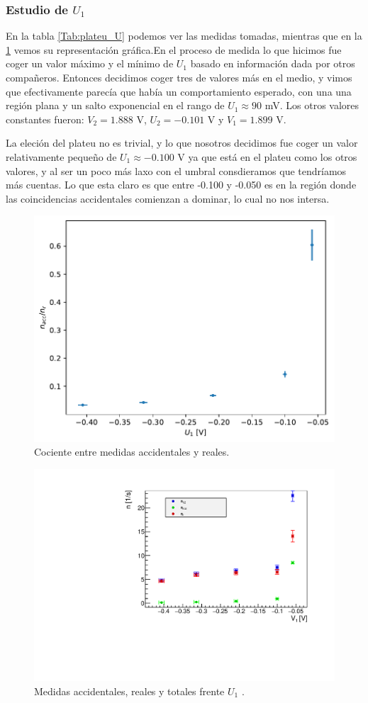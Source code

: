 \documentclass[11pt]{article}
\begin{document}
\subsubsection{Estudio de $U_1$}


En la tabla \ref{Tab:plateu_U} podemos ver las medidas tomadas, mientras que en la \cref{Fig:plateuU} vemos su representación gráfica.En el proceso de medida lo que hicimos fue coger un valor máximo  y el mínimo de $U_1$ basado en información dada por otros compañeros. Entonces decidimos coger tres de valores más en el medio, y vimos que efectivamente parecía que había un comportamiento esperado, con una una región plana y un salto exponencial en el rango de $U_1\approx 90$ mV. Los otros valores constantes fueron: $V_2=1.888$ V, $U_2=-0.101$ V y $V_1=1.899$ V.

La eleción del plateu no es trivial, y lo que nosotros decidimos fue coger un valor relativamente pequeño de $U_1\approx - 0.100$ V ya que  está en el plateu como los otros valores, y al ser un poco más laxo con el umbral consdieramos que tendríamos más cuentas. Lo que esta claro es que entre -0.100 y -0.050 es en la región donde las coincidencias accidentales comienzan a dominar, lo cual no nos intersa. 

\begin{figure}[h]
		\centering
		\caption{Cociente entre medidas accidentales y reales.}
		\label{Fig:plateuU}
		\includegraphics[width=0.6\linewidth]{../Graficas/GraficoU2.pdf}
\end{figure}



\begin{figure}[H]
	\centering
	\caption{Medidas accidentales, reales y totales frente $U_1$ \cite{Root}.}
	\label{Fig:plateuU2}
	\includegraphics[width=0.6\linewidth]{../Graficas/GraficoU.pdf}
\end{figure}
\end{document}
